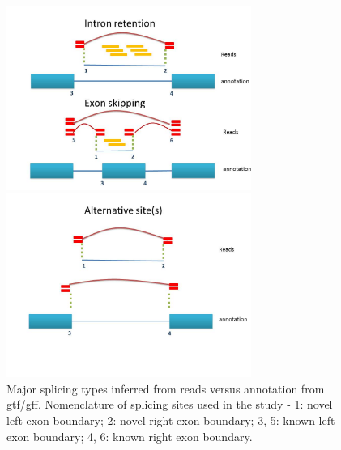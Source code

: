 \documentclass[a4paper]{article}
\begin{document}
\begin{figure}[ht]
\begin{minipage}[b]{0.5\linewidth} %
\centering
\includegraphics[width=8cm]{fig0a.jpg}
\end{minipage}
\hspace{0.5cm} %
\begin{minipage}[b]{0.5\linewidth}
\centering
\includegraphics[width=8cm]{fig0b.jpg}
\end{minipage}
\caption{Major splicing types inferred from reads versus annotation from gtf/gff. Nomenclature of splicing sites used in the study - 1: novel left exon boundary; 2: novel right exon boundary; 3, 5: known left exon boundary; 4, 6: known right exon boundary.}
\label{fig0}
\end{figure}
\end{document}
